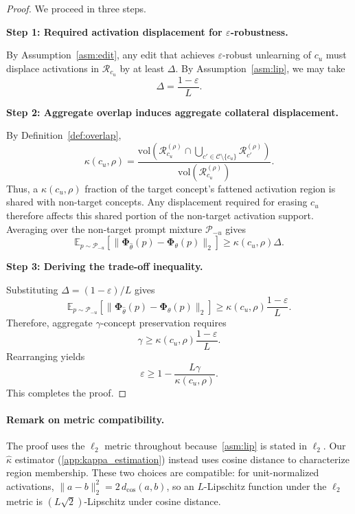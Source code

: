 \begin{proof}
We proceed in three steps.

\medskip
\noindent\textbf{Step 1: Required activation displacement for $\varepsilon$-robustness.}

By Assumption~\ref{asm:edit}, any edit that achieves $\varepsilon$-robust unlearning of $c_u$ must displace activations in $\mathcal{R}_{c_u}$ by at least $\Delta$. By Assumption~\ref{asm:lip}, we may take
\[
    \Delta = \frac{1-\varepsilon}{L}.
\]

\medskip
\noindent\textbf{Step 2: Aggregate overlap induces aggregate collateral displacement.}

By Definition~\ref{def:overlap},
\[
    \kappa(c_u,\rho)
    =
    \frac{
        \mathrm{vol}\!\left(
        \mathcal{R}_{c_u}^{(\rho)}
        \cap
        \bigcup_{c'\in\mathcal{C}\setminus\{c_u\}}
        \mathcal{R}_{c'}^{(\rho)}
        \right)
    }{
        \mathrm{vol}\!\left(
        \mathcal{R}_{c_u}^{(\rho)}
        \right)
    } .
\]
Thus, a $\kappa(c_u,\rho)$ fraction of the target concept's fattened activation region is shared with non-target concepts. Any displacement required for erasing $c_u$ therefore affects this shared portion of the non-target activation support. Averaging over the non-target prompt mixture $\mathcal{P}_{-u}$ gives
\begin{equation}
    \mathbb{E}_{p\sim \mathcal{P}_{-u}}
    \left[
    \|\boldsymbol{\Phi}_{\hat{\theta}}(p)-\boldsymbol{\Phi}_{\theta}(p)\|_2
    \right]
    \geq
    \kappa(c_u,\rho)\Delta .
\end{equation}

\medskip
\noindent\textbf{Step 3: Deriving the trade-off inequality.}

Substituting $\Delta=(1-\varepsilon)/L$ gives
\begin{equation}
    \mathbb{E}_{p\sim \mathcal{P}_{-u}}
    \left[
    \|\boldsymbol{\Phi}_{\hat{\theta}}(p)-\boldsymbol{\Phi}_{\theta}(p)\|_2
    \right]
    \geq
    \kappa(c_u,\rho)\frac{1-\varepsilon}{L}.
\end{equation}
Therefore, aggregate $\gamma$-concept preservation requires
\[
    \gamma
    \geq
    \kappa(c_u,\rho)\frac{1-\varepsilon}{L}.
\]
Rearranging yields
\[
    \varepsilon
    \geq
    1-\frac{L\gamma}{\kappa(c_u,\rho)}.
\]
This completes the proof.
\end{proof}



\paragraph{Remark on metric compatibility.}
The proof uses the $\ell_2$ metric throughout because~\cref{asm:lip} is stated in $\ell_2$. Our $\hat\kappa$ estimator (\cref{app:kappa_estimation}) instead uses cosine distance to characterize region membership. These two choices are compatible: for unit-normalized activations, $\|a - b\|_2^2 = 2\,d_{\cos}(a, b)$, so an $L$-Lipschitz function under the $\ell_2$ metric is $(L\sqrt{2})$-Lipschitz under cosine distance. 

